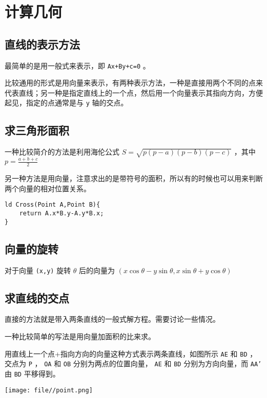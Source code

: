 \documentclass[UTF-8]{ctexart}
\begin{document}
	\section{计算几何}
	\subsection{直线的表示方法}
	最简单的是用一般式来表示，即 \texttt{Ax+By+c=0} 。  
	
	比较通用的形式是用向量来表示，有两种表示方法，一种是直接用两个不同的点来代表直线；另一种是指定直线上的一个点，然后用一个向量表示其指向方向，方便起见，指定的点通常是与 \texttt{y} 轴的交点。
	\subsection{求三角形面积}
	
	一种比较简介的方法是利用海伦公式 $S=\sqrt{p(p-a)(p-b)(p-c)}$ ，其中 $p=\frac{a+b+c}{2}$
	
	另一种方法是用向量，注意求出的是带符号的面积，所以有的时候也可以用来判断两个向量的相对位置关系。
	
\begin{verbatim}
ld Cross(Point A,Point B){
    return A.x*B.y-A.y*B.x;
}
\end{verbatim}
	
	\subsection{向量的旋转}
	对于向量 \texttt{(x,y)} 旋转 $\theta$ 后的向量为 $(x\cos\theta-y\sin\theta,x\sin\theta+y\cos\theta)$
	
	\subsection{求直线的交点}
	直接的方法就是带入两条直线的一般式解方程。需要讨论一些情况。  
	
	一种比较简单的写法是用向量加面积的比来求。
	  
	用直线上一个点+指向方向的向量这种方式表示两条直线，如图所示 \texttt{AE} 和 \texttt{BD} ，交点为 \texttt{P} ， \texttt{OA} 和 \texttt{OB} 分别为两点的位置向量， \texttt{AE} 和 \texttt{BD} 分别为方向向量，而 \texttt{AA'} 由 \texttt{BD} 平移得到。
	
	\begin{center}
		\texttt{[image: file//point.png]}
	\end{center}
\end{document}
